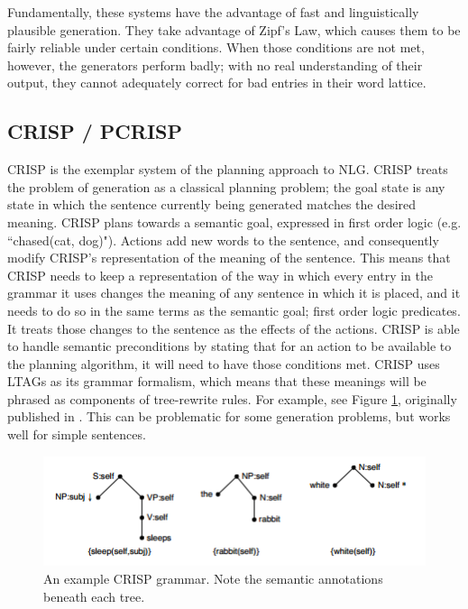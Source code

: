 Fundamentally, these systems have the advantage of
fast and linguistically plausible generation.  They
take advantage of Zipf's Law, which causes them
to be fairly reliable under certain conditions.  When
those conditions are not met, however, the generators perform
badly; with no real understanding of their output, they
cannot adequately correct for bad entries in their word
lattice.

\subsection{CRISP / PCRISP}

CRISP is the exemplar system of the planning approach to NLG.
CRISP treats the problem of generation as a classical planning
problem; the goal state is any state in which the sentence
currently being generated matches the desired meaning.
CRISP plans towards a semantic goal,
expressed in first order logic (e.g. ``chased(cat, dog)").
Actions add new words to the sentence, and consequently
modify CRISP's representation of the meaning of the sentence.
This means that CRISP needs to keep a representation of the
way in which every entry in the grammar it uses changes the
meaning of any sentence in which it is placed, and it needs to
do so in the same terms as the semantic goal; first order logic
predicates.
It treats those changes to the sentence as the effects of the
actions.  CRISP is able to handle semantic preconditions by
stating that for an action to be available to the planning algorithm,
it will need to have those conditions met.
CRISP uses LTAGs as its grammar formalism,
which means that these meanings will be phrased as components
of tree-rewrite rules.  For example, see Figure \ref{crisp-grammar},
originally published in \cite{koller_experiences_2011}.
This can be problematic for some generation problems, but works well
for simple sentences.

\begin{figure}
\centering
\includegraphics{crisp-grammar.png}
\caption{An example CRISP grammar.  Note the semantic annotations
beneath each tree.}
\label{crisp-grammar}
\end{figure}

